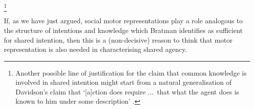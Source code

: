 \documentclass[12pt,\papersize]{extarticle}
\begin{document}
\footnote{
Another possible line of justification for the claim that common knowledge is involved in shared intention might start from a natural generalisation of Davidson's claim that
`[a]ction does require %
...\ that what the agent does is known to him under some description' \citep[p.\ 50]{Davidson:1971fz}. 
} 

If, as we have just argued, social motor representations play a role analogous to the structure of intentions and knowledge which Bratman identifies as sufficient for shared intention, then this is a  (non-decisive) reason to think that motor representation is also needed in characterising shared agency.
\end{document}
